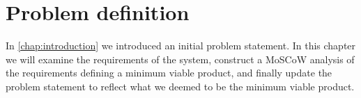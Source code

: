 \chapter{Problem definition}
In \autoref{chap:introduction} we introduced an initial problem statement.
In this chapter we will examine the requirements of the system, construct a MoSCoW analysis of the requirements defining a minimum viable product, and finally update the problem statement to reflect what we deemed to be the minimum viable product.



